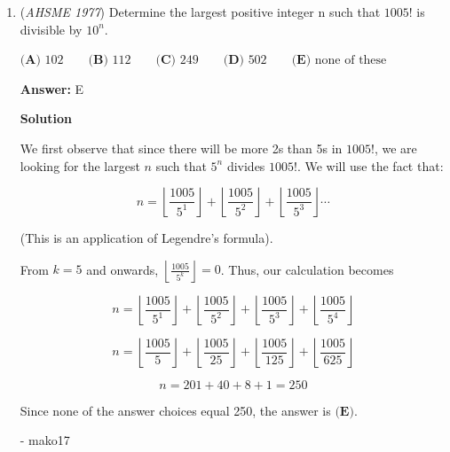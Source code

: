 \begin{enumerate}
 $\textbf{(A) }\frac{127}{255}\qquad \textbf{(B) }\frac{128}{255}\qquad \textbf{(C) }\frac{1}{2}\qquad \textbf{(D) }\frac{128}{257}\qquad \textbf{(E) }\frac{129}{257}$

 \textbf{Answer: }D



\textbf{Solution}

Note that $\frac{1}{(2n-1)(2n+1)} = \frac{1/(2n-1)-1/(2n+1)}{2}$. Indeed, we find the series telescopes and is equal to $\frac{1-\frac{1}{257}}{2}$, which is evidently $\boxed {\frac{128}{257}}$



	\item (\textit{AHSME 1977}) Determine the largest positive integer n such that $1005!$ is divisible by $10^n$.


 $\textbf{(A) }102\qquad \textbf{(B) }112\qquad \textbf{(C) }249\qquad \textbf{(D) }502\qquad  \textbf{(E) }\text{none of these}$

 \textbf{Answer: }E



\textbf{Solution}

We first observe that since there will be more 2s than 5s in $1005!$, we are looking for the largest $n$ such that $5^n$ divides $1005!$. We will use the fact that:

 
 \[n = \left \lfloor {\frac{1005}{5^1}}\right \rfloor + \left \lfloor {\frac{1005}{5^2}}\right \rfloor + \left \lfloor {\frac{1005}{5^3}}\right \rfloor \cdots\]

 (This is an application of Legendre's formula).

 From $k=5$ and onwards, $\left \lfloor {\frac{1005}{5^k}}\right \rfloor = 0$. Thus, our calculation becomes

 
 \[n = \left \lfloor {\frac{1005}{5^1}}\right \rfloor + \left \lfloor {\frac{1005}{5^2}}\right \rfloor + \left \lfloor {\frac{1005}{5^3}}\right \rfloor + \left \lfloor {\frac{1005}{5^4}}\right \rfloor\]

 \[n = \left \lfloor {\frac{1005}{5}}\right \rfloor + \left \lfloor {\frac{1005}{25}}\right \rfloor + \left \lfloor {\frac{1005}{125}}\right \rfloor + \left \lfloor {\frac{1005}{625}}\right \rfloor\]

 \[n = 201 + 40 + 8 + 1 = \boxed{250}\]

 Since none of the answer choices equal 250, the answer is $\boxed{\textbf{(E)}}$.

 - mako17

 



\end{enumerate}
